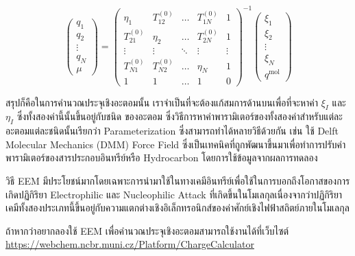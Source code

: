 \begin{equation}
  \left(\begin{array}{c}
      q_1    \\
      q_2    \\
      \vdots \\
      q_N    \\
      \mu
    \end{array}\right)
  =
  \left(\begin{array}{ccccc}
    \eta_1        & T_{12}^{(0)}  & \ldots & T_{1 N}^{(0)} & 1      \\
    T_{21}^{(0)}  & \eta_2        & \ldots & T_{2 N}^{(0)} & 1      \\
    \vdots        & \vdots        & \ddots & \vdots        & \vdots \\
    T_{N 1}^{(0)} & T_{N 2}^{(0)} & \ldots & \eta_N        & 1      \\
    1             & 1             & \ldots & 1             & 0
  \end{array}\right)^{-1}\left(\begin{array}{c}
      \xi_1  \\
      \xi_2  \\
      \vdots \\
      \xi_N  \\
      q^{\mathrm{mol}}
    \end{array}\right)
\end{equation}

สรุปก็คือในการคำนวณประจุเชิงอะตอมนั้น เราจำเป็นที่จะต้องแก้สมการด้านบนเพื่อที่จะหาค่า $\xi_I$ และ $\eta_I$ ซึ่งทั้งสองค่านี้นั้นขึ้นอยู่กับชนิด%
ของอะตอม ซึ่งวิธีการหาค่าพารามิเตอร์ของทั้งสองค่าสำหรับแต่ละอะตอมแต่ละชนิดนั้นเรียกว่า Parameterization ซึ่งสามารถทำได้หลายวิธีด้วยกัน เช่น
ใช้ Delft Molecular Mechanics (DMM) Force Field ซึ่งเป็นเทคนิคที่ถูกพัฒนาขึ้นมาเพื่อทำการปรับค่าพารามิเตอร์ของสารประกอบอินทรีย์หรือ
Hydrocarbon โดยการใช้ข้อมูลจากผลการทดลอง

วิธี EEM มีประโยชน์มากโดยเฉพาะการนำมาใช้ในทางเคมีอินทรีย์เพื่อใช้ในการบอกถึงโอกาสของการเกิดปฏิกิริยา Electrophilic และ Nucleophilic
Attack ที่เกิดขึ้นในโมเลกุลเนื่องจากว่าปฏิกิริยาเคมีทั้งสองประเภทนี้ขึ้นอยู่กับความแตกต่างเชิงอิเล็กทรอนิกส์ของค่าศักย์เชิงไฟฟ้าสถิตย์ภายในโมเลกุล

ถ้าหากว่าอยากลองใช้ EEM เพื่อคำนวณประจุเชิงอะตอมสามารถใช้งานได้ที่เว็บไซต์ \url{https://webchem.ncbr.muni.cz/Platform/ChargeCalculator}

